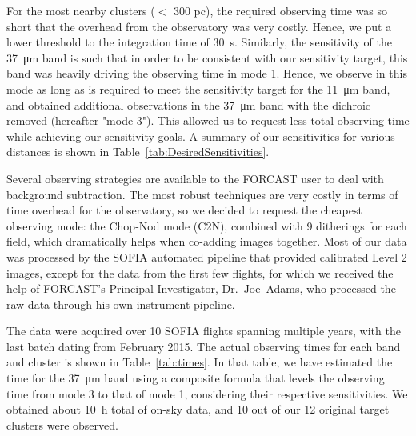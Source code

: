 For the most nearby clusters ($<$ 300 pc), the required observing time was so short that the overhead from the observatory was very costly. Hence, we put a lower threshold to the integration time of \SI{30}{\second}. Similarly, the sensitivity of the \SI{37}{\um} band is such that in order to be consistent with our sensitivity target, this band was heavily driving the observing time in mode 1. Hence, we observe in this mode as long as is required to meet the sensitivity target for the \SI{11}{\um} band, and obtained additional observations in the \SI{37}{\um} band with the dichroic removed (hereafter "mode 3"). This allowed us to request less total observing time while achieving our sensitivity goals. A summary of our sensitivities for various distances is shown in Table~\ref{tab:DesiredSensitivities}.

Several observing strategies are available to the FORCAST user to deal with background subtraction. The most robust techniques are very costly in terms of time overhead for the observatory, so we decided to request the cheapest observing mode: the Chop-Nod mode (C2N), combined with 9 ditherings for each field, which dramatically helps when co-adding images together. Most of our data was processed by the SOFIA automated pipeline that provided calibrated Level 2 images, except for the data from the first few flights, for which we received the help of FORCAST's Principal Investigator, Dr.~Joe~Adams, who processed the raw data through his own instrument pipeline.


The data were acquired over 10 SOFIA flights spanning multiple years, with the last batch dating from February 2015. The actual observing times for each band and cluster is shown in Table~\ref{tab:times}. In that table, we have estimated the time for the \SI{37}{\um} band using a composite formula that levels the observing time from mode 3 to that of mode 1, considering their respective sensitivities. We obtained about \SI{10}{\hour} total of on-sky data, and 10 out of our 12 original target clusters were observed.

